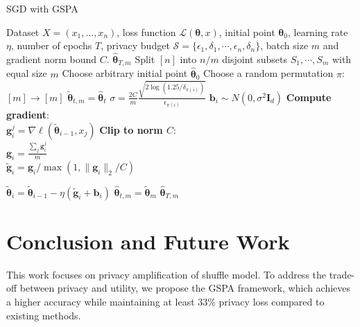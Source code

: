 \documentclass[letterpaper]{article} %
\begin{document}
\begin{algorithm}[h]
    \caption{SGD with GSPA}
    \label{alg:SGD}
    \renewcommand{\algorithmicrequire}{\textbf{Input:}}
    \renewcommand{\algorithmicensure}{\textbf{Output:}}
    \begin{algorithmic}[1]
        \REQUIRE Dataset $X = (x_1,\ldots,x_n)$, loss function $\mathcal{L}(\pmb \theta,x)$, initial point $\pmb \theta_0$, learning rate $\eta$, number of epochs $T$, privacy budget $\mathcal{S} = \{\epsilon_1, \delta_1, \cdots, \epsilon_n,\delta_n\}$,  batch size $m$ and gradient norm bound $C$. %
        \ENSURE $\hat{\pmb \theta}_{T,m}$   %
        \STATE
        Split $[n]$ into $n/m$ disjoint subsets $S_1, \cdots, S_m$ with equal size $m$
        \STATE Choose arbitrary initial point $ \hat{\pmb \theta}_{0}$
        \STATE Choose a random permutation $\pi$: $[m] \rightarrow [m]$
        \STATE $\tilde{\pmb\theta}_{t,m} = \hat{\pmb \theta}_{t}$
        \STATE $\sigma=\frac{2C}{m}\frac{\sqrt{2\log(1.25/\delta_{\pi(i)})}}{\epsilon_{\pi(i)}}$
            \STATE $\pmb b_i \sim N(0,\sigma^2 \pmb{I}_d)$
            \STATE \textbf{Compute gradient}:\\
            $\pmb g_i^{j} = \nabla \ell(\tilde{\pmb \theta}_{i-1},x_j)$
            \ENDFOR
            \STATE \textbf{Clip to norm $C$}:\\
            $\pmb g_i = \frac{\sum_j \pmb g_i^j}{m}$ \\
            $\tilde{\pmb g}_i =  {\pmb g_i} / \max(1,\| \pmb g_i \|_2/C)$

            \STATE $\tilde{\pmb \theta}_{i} = \tilde{\pmb \theta}_{i-1} - \eta ( \tilde{\pmb g}_i+\pmb b_i)$
        \ENDFOR
        \STATE $\hat{\pmb \theta}_{t,m} = \tilde{\pmb \theta}_m$
        \ENDFOR
        \RETURN $\hat{\pmb \theta}_{T,m}$
    \end{algorithmic}
\end{algorithm}
\section{Conclusion and Future Work}
This work focuses on privacy amplification of shuffle model. To address the trade-off between privacy and utility, we propose the GSPA framework, which achieves a higher accuracy while maintaining at least 33\% privacy loss compared to existing methods.
\end{document}
